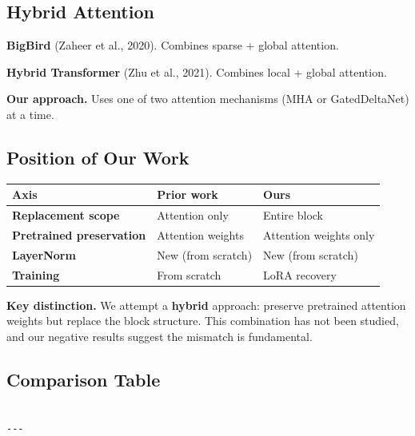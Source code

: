 \subsection{Hybrid Attention}

\textbf{BigBird} (Zaheer et al., 2020). Combines sparse + global attention.

\textbf{Hybrid Transformer} (Zhu et al., 2021). Combines local + global attention.

\textbf{Our approach.} Uses one of two attention mechanisms (MHA or GatedDeltaNet) 
at a time.

\subsection{Position of Our Work}

\begin{table}[H]
\centering
\small
\begin{tabular}{lll}
\toprule
\textbf{Axis} & \textbf{Prior work} & \textbf{Ours} \\
\midrule
\textbf{Replacement scope} & Attention only & Entire block \\
\textbf{Pretrained preservation} & Attention weights & Attention weights only \\
\textbf{LayerNorm} & New (from scratch) & New (from scratch) \\
\textbf{Training} & From scratch & LoRA recovery \\
\bottomrule
\end{tabular}
\end{table}

\textbf{Key distinction.} We attempt a \textbf{hybrid} approach: preserve pretrained 
attention weights but replace the block structure. This combination has 
not been studied, and our negative results suggest the mismatch is 
fundamental.



\subsection{Comparison Table}

\begin{lstlisting}

---
\end{lstlisting}